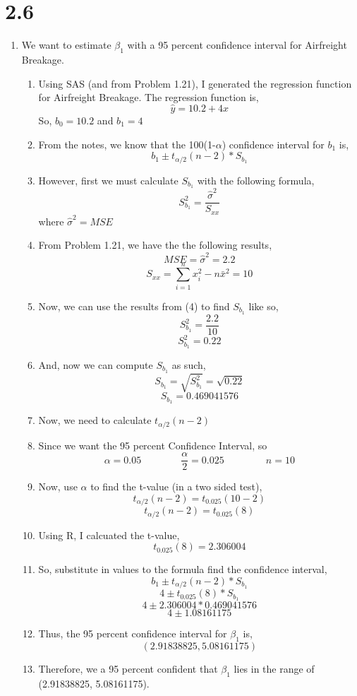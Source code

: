 \documentclass{article}
\begin{document}
\section*{2.6}
	\begin{enumerate}[label = \alph*)]
		\item We want to estimate $\beta_1$ with a 95 percent confidence interval for Airfreight Breakage.
		\begin{enumerate}[label = \arabic*)]
			\item Using SAS (and from Problem 1.21), I generated the regression function for Airfreight Breakage.
			The regression function is,
			\[\hat{y} = 10.2 +4x\]
			So, $b_0 = 10.2$ and $b_1 = 4$
			\item From the notes, we know that the 100(1-$\alpha$) confidence interval for $b_1$ is,
			\[b_1 \pm t_{\alpha/2}(n-2)* S_{b_1}\]
			\item However, first we must calculate $S_{b_1}$ with the following formula,
			\[S_{b_1}^2 = \frac{\hat{\sigma}^2}{S_{xx}}\] where $\hat{\sigma}^2 = MSE$
			\item From Problem 1.21, we have the the following results,
			\[MSE = \hat{\sigma}^2 = 2.2\]
			\[S_{xx} = \sum_{i=1}^n x_i^2 - n\bar{x}^2 = 10\]
			\item Now, we can use the results from (4) to find $S_{b_1}$ like so,
			\[S_{b_1}^2 = \frac{2.2}{10}\]
			\[S_{b_1}^2 = 0.22\]
			\item And, now we can compute $S_{b_1}$ as such,
			\[S_{b_1} = \sqrt{S_{b_1}^2} = \sqrt{0.22}\]
			\[S_{b_1} = 0.469041576\]
			\item Now, we need to calculate $t_{\alpha/2}(n-2)$
			\item Since we want the 95 percent Confidence Interval, so
			\[\alpha = 0.05 \qquad \qquad \frac{\alpha}{2} = 0.025\ \qquad \qquad n=10\]
			\item Now, use $\alpha$ to find the t-value (in a two sided test),
			\[t_{\alpha/2}(n-2) = t_{0.025}(10-2)\]
			\[t_{\alpha/2}(n-2) = t_{0.025}(8)\]
			\item Using R, I calcuated the t-value,
			\[t_{0.025}(8) = 2.306004\]
			\item So, substitute in values to the formula find the confidence interval,
			\[b_1 \pm t_{\alpha/2}(n-2)*S_{b_1}\]
			\[4 \pm t_{0.025}(8)*S_{b_1}\]
			\[4 \pm 2.306004*0.469041576\]
			\[4 \pm 1.08161175\]
			\item Thus, the 95 percent confidence interval for $\beta_1$ is,
			\[(2.91838825, 5.08161175)\]
			\item Therefore, we a 95 percent confident that $\beta_1$ lies in the range of (2.91838825, 5.08161175).

\end{enumerate}
\end{enumerate}
\end{document}
